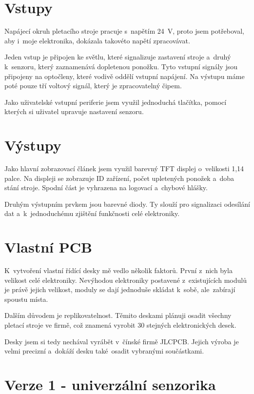 \section{Vstupy}
Napájecí okruh pletacího stroje pracuje s~napětím 24~V, proto jsem potřebo\-val, aby i~moje elektronika, dokázala takovéto napětí zpracovávat.

Jeden vstup je připojen ke světlu, které signalizuje zastavení stroje a~druhý k~senzoru, který zaznamenává dopletenou ponožku.
Tyto vstupní signály jsou připojeny na optočleny, které vodivě oddělí vstupní napájení.
Na výstupu máme poté pouze tří voltový signál, který je zpracovatelný čipem.

Jako uživatelské vstupní periferie jsem využil jednoduchá tlačítka, pomocí kterých si uživatel upravuje nastavení senzoru.


\section{Výstupy}
Jako hlavní zobrazovací článek jsem využil barevný TFT displej o~velikosti 1,14 palce.
Na displeji se zobrazuje ID zařízení, počet upletených ponožek a~doba stání stroje.
Spodní část je vyhrazena na logovací a~chybové hlášky.

Druhým výstupním prvkem jsou barevné diody.
Ty slouží pro signalizaci odesílání dat a~k~jednoduchému zjištění funkčnosti celé elektroniky.



\section{Vlastní PCB}
K~vytvoření vlastní řídící desky mě vedlo několik faktorů. První z~nich byla velikost celé elektroniky. 
Nevýhodou elektroniky postavené z~existujících modulů je právě jejich velikost, moduly se dají jednoduše skládat k~sobě, ale~zabírají spoustu místa. 
 
Dalším důvodem je replikovatelnost. Těmito deskami plánuji osadit všechny pletací stroje ve firmě, což znamená vyrobit 30 stejných elektronických desek.

Desky jsem si tedy nechával vyrábět v~čínské firmě JLCPCB. Jejich výroba je velmi precizní a~dokáží desku také~osadit vybranými součástkami.


\newpage

\section{Verze 1 - univerzální senzorika}

